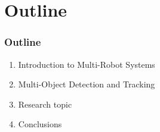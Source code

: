 \section{Outline}

\begin{frame}
	\frametitle{Outline}
	
	\begin{enumerate}
		\item Introduction to Multi-Robot Systems
		\item Multi-Object Detection and Tracking
		\item Research topic
		\item Conclusions
	\end{enumerate}
\end{frame}
